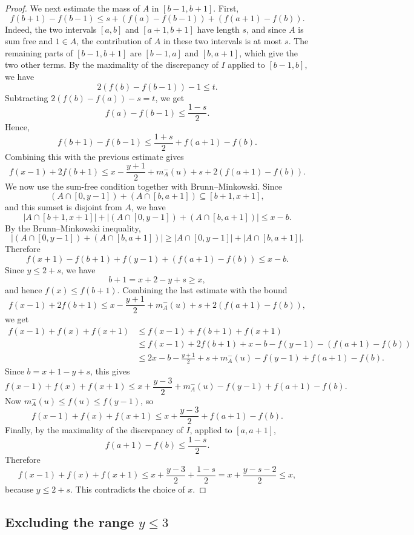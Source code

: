 \documentclass[11pt,reqno]{amsart}
\theoremstyle{definition}
\def\F#1{f(#1)}
\begin{document}
\begin{proof}
We next estimate the mass of $A$ in $[b-1,b+1]$. First, 
$$ 
\F{b+1}-\F{b-1} \leq s+(\F{a}-\F{b-1})+(\F{a+1}-\F{b}). 
$$ 
Indeed, the two intervals $[a,b]$ and $[a+1,b+1]$ have length $s$, and since $A$ is sum free and $1\in A$, the contribution of $A$ in these two intervals is at most $s$. The remaining parts of $[b-1,b+1]$ are $[b-1,a]$ and $[b,a+1]$, which give the two other terms. By the maximality of the discrepancy of $I$ applied to $[b-1,b]$, we have
$$
2(\F{b}-\F{b-1})-1\leq t.
$$
Subtracting $2(\F{b}-\F{a})-s=t$, we get
$$
\F{a}-\F{b-1}\leq \frac{1-s}{2}.
$$
Hence, 
$$ 
\F{b+1}-\F{b-1} \leq \frac{1+s}{2}+\F{a+1}-\F{b}. 
$$ 
Combining this with the previous estimate gives 
$$ 
\F{x-1}+2\F{b+1} \leq x-\frac{y+1}{2}+m_A^-(u)+s+2(\F{a+1}-\F{b}). $$
We now use the sum-free condition together with Brunn--Minkowski. Since
$$
    (A\cap[0,y-1])+(A\cap[b,a+1])
    \subseteq [b+1,x+1],
$$
and this sumset is disjoint from $A$, we have
$$
    |A\cap[b+1,x+1]|
    +
    |(A\cap[0,y-1])+(A\cap[b,a+1])|
    \leq x-b.
$$
By the Brunn--Minkowski inequality, 
$$
    |(A\cap[0,y-1])+(A\cap[b,a+1])|
    \geq
    |A\cap[0,y-1]|+|A\cap[b,a+1]|.
$$
Therefore
$$
    \F{x+1}-\F{b+1}+\F{y-1}+(\F{a+1}-\F{b})\leq x-b.
$$
Since $y\leq 2+s$, we have
$$
    b+1=x+2-y+s\geq x,
$$
and hence $\F{x}\leq \F{b+1}$. Combining the last estimate with the bound
$$
    \F{x-1}+2\F{b+1}
    \leq
    x-\frac{y+1}{2}+m_A^-(u)+s+2(\F{a+1}-\F{b}),
$$
we get
$$
\begin{aligned}
    \F{x-1}+\F{x}+\F{x+1}
    &\leq \F{x-1}+\F{b+1}+\F{x+1} \\
    &\leq \F{x-1}+2\F{b+1}+x-b-\F{y-1}-(\F{a+1}-\F{b}) \\
    &\leq 2x-b-\frac{y+1}{2}+s+m_A^-(u)-\F{y-1}+\F{a+1}-\F{b}.
\end{aligned}
$$
Since $b=x+1-y+s$, this gives
$$
    \F{x-1}+\F{x}+\F{x+1}
    \leq
    x+\frac{y-3}{2}+m_A^-(u)-\F{y-1}+\F{a+1}-\F{b}.
$$
Now $m_A^-(u)\leq \F{u}\leq \F{y-1}$, so
$$
    \F{x-1}+\F{x}+\F{x+1}
    \leq
    x+\frac{y-3}{2}+\F{a+1}-\F{b}.
$$
Finally, by the maximality of the discrepancy of $I$, applied to $[a,a+1]$,
$$
    \F{a+1}-\F{b}\leq \frac{1-s}{2}.
$$
Therefore
$$
    \F{x-1}+\F{x}+\F{x+1}
    \leq
    x+\frac{y-3}{2}+\frac{1-s}{2}
    =
    x+\frac{y-s-2}{2}
    \leq x,
$$
because $y\leq 2+s$. This contradicts the choice of $x$.
\end{proof}


\subsection{Excluding the range $y\leq 3$}
\end{document}
